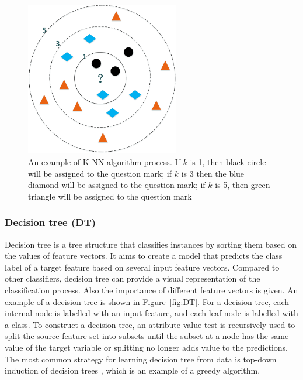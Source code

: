 \begin{figure}[htb!]
\centering
\includegraphics[width=0.6\textwidth]{image/Method/KNN.png}
\caption[A K-NN classifier]{An example of K-NN algorithm process. If $k$ is 1, then black circle will be assigned to the question mark; if $k$ is 3 then the blue diamond will be assigned to the question mark; if $k$ is 5, then green triangle will be assigned to the question mark}
\label{fig:K-NN}
\end{figure}




\subsubsection{Decision tree (DT)}
Decision tree is a tree structure that classifies instances by sorting them based on the values of feature vectors. It aims to create a model that predicts the class label of a target feature based on several input feature vectors.  Compared to other classifiers, decision tree can provide a visual representation of the classification process. Also the importance of different feature vectors is given. An example of a decision tree is shown in Figure~\ref{fig:DT}.  For a decision tree, each internal node is labelled with an input feature, and each leaf node is labelled with a class. To construct a decision tree, an attribute value test is recursively used to split the source feature set into subsets until the subset at a node has the same value of the target variable or splitting no longer adds value to the predictions. The most common strategy for learning decision tree from data is top-down induction of decision trees \citep{quinlan1986induction}, which is an example of a greedy algorithm. 
 

